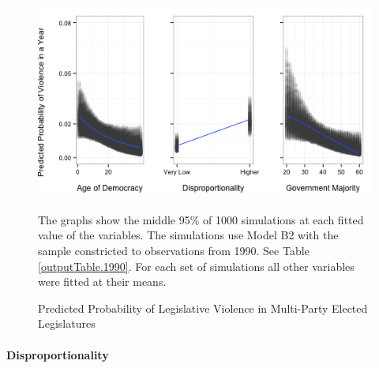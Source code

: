 \documentclass[a4paper]{article}\usepackage[]{graphicx}\usepackage[]{color}
\newenvironment{knitrout}{}{} %
\begin{document}
\begin{figure}[t]
    \caption{Predicted Probability of Legislative Violence in Multi-Party Elected Legislatures}  
    \label{pred_prob}
    \begin{center}


\begin{knitrout}
\color{fgcolor}
\includegraphics[width=0.8\linewidth]{figure/predProb} 

\end{knitrout}

    \end{center}
    \begin{singlespace}
      {\scriptsize{The graphs show the middle 95\% of 1000 simulations at each fitted value of the variables. The simulations use Model B2 with the sample constricted to observations from 1990. See Table \ref{outputTable.1990}. For each set of simulations all other variables were fitted at their means.}}
    \end{singlespace}
\end{figure}

\paragraph{Disproportionality}
\end{document}
